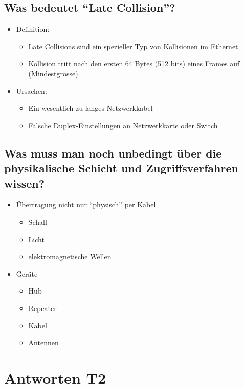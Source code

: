\subsection*{Was bedeutet "`Late Collision"'?}
\begin{itemize}
    \item Definition:
    \begin{itemize}
        \item Late Collisions sind ein spezieller Typ von Kollisionen im Ethernet
        \item Kollision tritt nach den ersten 64 Bytes (512 bits) eines Frames auf (Mindestgrösse)
    \end{itemize}
    \item Ursachen:
    \begin{itemize}
        \item Ein wesentlich zu langes Netzwerkkabel
        \item Falsche Duplex-Einstellungen an Netzwerkkarte oder Switch
    \end{itemize}
\end{itemize}

\subsection*{Was muss man noch unbedingt über die physikalische Schicht und Zugriffsverfahren wissen?}
\begin{itemize}
    \item Übertragung nicht nur "`physisch"' per Kabel
    \begin{itemize}
        \item Schall
        \item Licht
        \item elektromagnetische Wellen
    \end{itemize}
    \item Geräte
    \begin{itemize}
        \item Hub
        \item Repeater
        \item Kabel
        \item Antennen
    \end{itemize}
\end{itemize}

\section{Antworten T2}
